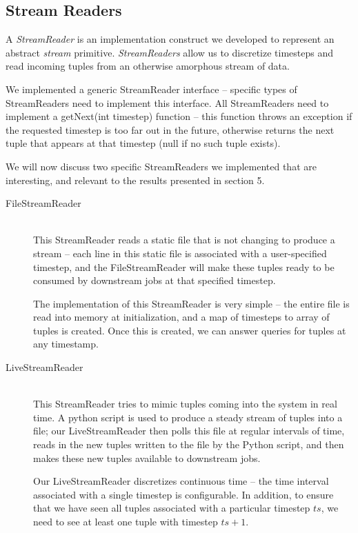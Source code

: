 \documentclass[a4paper, 10pt, conference]{IEEEconf}
\begin{document}
\subsection{Stream Readers}
A \textit{StreamReader} is an implementation construct we developed to represent an abstract \textit{stream} primitive. \textit{StreamReaders} allow us to discretize timesteps and read incoming tuples from an otherwise amorphous stream of data.

We implemented a generic StreamReader interface -- specific types of StreamReaders need to implement this interface. All StreamReaders need to implement a getNext(int timestep) function -- this function throws an exception if the requested timestep is too far out in the future, otherwise returns the next tuple that appears at that timestep (null if no such tuple exists).

We will now discuss two specific StreamReaders we implemented that are interesting, and relevant to the results presented in section 5.

\begin{description}
  \item[FileStreamReader] \hfill \\
  This StreamReader reads a static file that is not changing to produce a stream -- each line in this static file is associated with a user-specified timestep, and the FileStreamReader will make these tuples ready to be consumed by downstream jobs at that specified timestep.
  
  The implementation of this StreamReader is very simple -- the entire file is read into memory at initialization, and a map of timesteps to array of tuples is created. Once this is created, we can answer queries for tuples at any timestamp.
  
  \item[LiveStreamReader] \hfill \\
  This StreamReader tries to mimic tuples coming into the system in real time. A python script is used to produce a steady stream of tuples into a file; our LiveStreamReader then polls this file at regular intervals of time, reads in the new tuples written to the file by the Python script, and then makes these new tuples available to downstream jobs.

  Our LiveStreamReader discretizes continuous time -- the time interval associated with a single timestep is configurable. In addition, to ensure that we have seen all tuples associated with a particular timestep $ts$, we need to see at least one tuple with timestep $ts + 1$.
\end{description}
\end{document}

